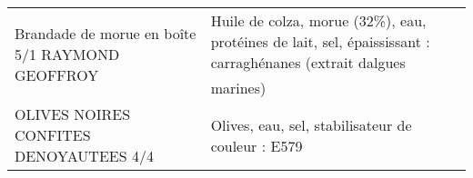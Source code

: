 \begin{longtable}{p{5cm}p{10cm}}
                                                          Brandade de morue en boîte 5/1 RAYMOND GEOFFROY &                                                                                                                                                                                                                                                                                                                                                                                                                                                                                                                                                                                                                                                                                                                                                                                                                                                                                                                        Huile de colza, morue (32\%), eau, protéines de lait, sel, épaississant : carraghénanes (extrait dalgues marines) \\
                                                                   OLIVES NOIRES CONFITES DENOYAUTEES 4/4 &                                                                                                                                                                                                                                                                                                                                                                                                                                                                                                                                                                                                                                                                                                                                                                                                                                                                                                                                                                                        Olives, eau, sel, stabilisateur de couleur : E579 \\

\end{longtable}
